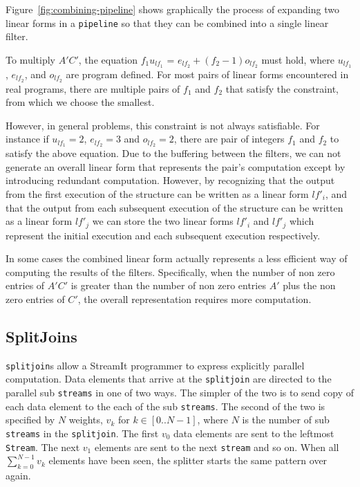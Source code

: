 Figure~\ref{fig:combining-pipeline} shows graphically the process of expanding
two linear forms in a {\tt pipeline} so that they can be combined into a single linear filter.

To multiply $A'C'$, the equation
$f_1u_{lf_1}$ = $e_{lf_2} + (f_2-1)o_{lf_2}$ must hold, where $u_{lf_1}$, $e_{lf_2}$, and $o_{lf_2}$
are program defined. For most pairs of linear forms encountered in real programs, 
there are multiple pairs of $f_1$ and $f_2$ that satisfy the constraint, from which
we choose the smallest.

However, in general problems, this constraint is not always satisfiable. For instance if
$u_{lf_1}=2$, $e_{lf_2}=3$ and $o_{lf_2}=2$, there are pair of integers $f_1$ and $f_2$ to 
satisfy the above equation. Due to the buffering between the filters, we can not generate an 
overall linear form that represents the pair's computation except by introducing redundant
computation. However, by recognizing that the output from the first execution of the structure
can be written as a linear form $lf'_i$, and that the output from each subsequent execution
of the structure can be written as a linear form $lf'_j$ we can store the two linear forms $lf'_i$ and
$lf'_j$ which represent the initial execution and each subsequent execution respectively.

In some cases the combined linear form
actually represents a less efficient way of computing the results of the
filters. Specifically, when the number of non zero entries of $A'C'$ is greater
than the number of non zero entries $A'$ plus the non zero entries of $C'$, the overall
representation requires more computation.


\subsection{SplitJoins}
{\tt splitjoin}s allow a StreamIt programmer to express explicitly parallel computation. 
Data elements that arrive at the {\tt splitjoin} are directed
to the parallel sub {\tt streams} in one of two ways.
The simpler of the two is to send copy of each data element to the each of the sub {\tt streams}. 
The second of the two is specified by $N$ weights, $v_k$ for $k\in[0..N-1]$, 
where $N$ is the number of sub {\tt streams} in the {\tt splitjoin}. The first $v_0$ data elements
are sent to the leftmost {\tt Stream}. The next $v_1$ elements are sent 
to the next {\tt stream} and so on. When all $\sum_{k=0}^{N-1} v_k$ elements
have been seen, the splitter starts the same pattern over again.

